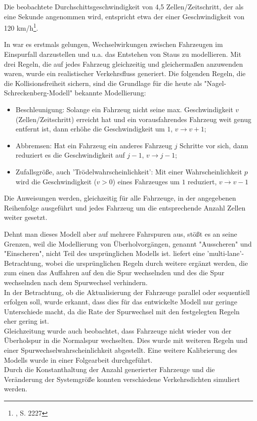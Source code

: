 Die beobachtete Durchschittsgeschwindigkeit von 4,5 Zellen/Zeitschritt, der als eine Sekunde angenommen wird, entspricht etwa der einer Geschwindigkeit von 120 km/h\footnote{\cite{na-sch}, S. 2227}. 

In \cite{na-sch} war es erstmals gelungen, Wechselwirkungen zwischen Fahrzeugen im Einspurfall darzustellen  und u.a. das Entstehen von Staus zu modellieren. 
Mit drei Regeln, die auf jedes Fahrzeug gleichzeitig und gleichermaßen anzuwenden waren, wurde ein realistischer Verkehrsfluss generiert. 
Die folgenden Regeln, die die Kollisionsfreiheit sichern, sind die Grundlage für die heute als "Nagel-Schreckenberg-Modell" bekannte Modellierung: 

\begin{itemize}
\item Beschleunigung: Solange ein Fahrzeug nicht seine max. Geschwindigkeit $v$ (Zellen/Zeitschritt) erreicht hat und ein vorausfahrendes Fahrzeug weit genug entfernt ist, dann erhöhe die Geschwindigkeit um $1$, $v \rightarrow v+1$;
\item Abbremsen: Hat ein Fahrzeug ein anderes Fahrzeug $j$ Schritte vor sich, dann reduziert es die Geschwindigkeit auf $j-1$, $v \rightarrow j-1$;
\item Zufallsgröße, auch 'Trödelwahrscheinlichkeit': Mit einer Wahrscheinlichkeit $p$ wird die Geschwindigkeit ($v > 0$) eines Fahrzeuges um $1$ reduziert, $v \rightarrow v-1$
\end{itemize}

Die Anweisungen werden, gleichzeitig für alle Fahrzeuge, in der angegebenen Reihenfolge ausgeführt und jedes Fahrzeug um die entsprechende Anzahl Zellen weiter gesetzt.

Dehnt man dieses Modell aber auf mehrere Fahrspuren aus, stößt es an seine Grenzen, weil die Modellierung von Überholvorgängen, genannt "Ausscheren" und "Einscheren", nicht Teil des ursprünglichen Modells ist. 
\cite{multi-lane} liefert eine 'multi-lane'-Betrachtung, wobei die ursprünglichen Regeln durch weitere ergänzt werden, die zum einen das Auffahren auf den die Spur wechselnden und des die Spur wechselnden nach dem Spurwechsel verhindern. \\
In der Betrachtung, ob die Aktualisierung der Fahrzeuge parallel oder sequentiell erfolgen soll, wurde erkannt, dass dies für das entwickelte Modell nur geringe Unterschiede macht, da die Rate der Spurwechsel mit den festgelegten Regeln eher gering ist. \\
Gleichzeitung wurde auch beobachtet, dass Fahrzeuge nicht wieder von der Überholspur in die Normalspur wechselten. Dies wurde mit weiteren Regeln und einer Spurwechselwahrscheinlichkeit abgestellt. Eine weitere Kalibrierung des Modells wurde in einer Folgearbeit durchgeführt. \\
Durch die Konstanthaltung der Anzahl generierter Fahrzeuge und die Veränderung der Systemgröße konnten verschiedene Verkehrsdichten simuliert werden.

